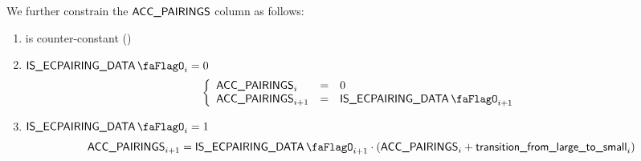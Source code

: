 We further constrain the $\textsf{ACC\_PAIRINGS}$ column as follows:
\begin{enumerate}
    \item \accPairings{} is counter-constant \quad (\trash)
    \item \If $\isEcpairingData_{i} = 0$ \Then
        \[
            \left\{ \begin{array}{lcl}
                \accPairings_{i}     & = & 0                        \\
                \accPairings_{i + 1} & = & \isEcpairingData_{i + 1} \\
            \end{array} \right.
        \]
    \item \If $\isEcpairingData_{i} = 1$ \Then
        \[
            \accPairings_{i+1}
            =
            \isEcpairingData_{i+1} \cdot (\accPairings_{i} + \locTransitionFromLargeToSmall_{i})
        \]
\end{enumerate}

